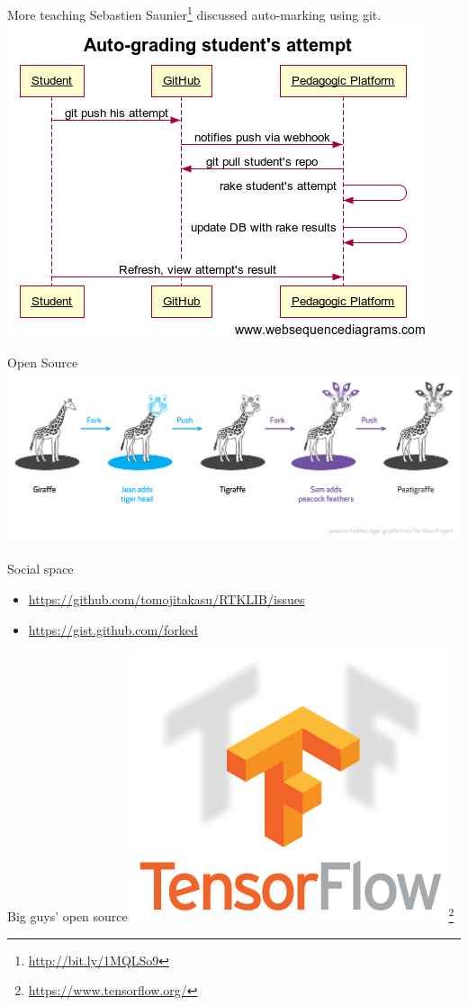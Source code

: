 \documentclass[11pt]{beamer}
\begin{document}
\begin{frame}{More teaching}
Sebastien Saunier\footnote{\url{http://bit.ly/1MQLSo9}} discussed auto-marking using git.
\centering
\includegraphics[height=0.7\textheight]{pic/git_teaching.png}
\end{frame}


\begin{frame}{Open Source}
\centering
\includegraphics[width=\textwidth]{pic/git-OS.png}
\end{frame}


\begin{frame}{Social space}
\begin{itemize}
	\item \url{https://github.com/tomojitakasu/RTKLIB/issues}
	\item \url{https://gist.github.com/forked}
\end{itemize}
\end{frame}


\begin{frame}{Big guys' open source}
\centering
\includegraphics[width=.6\textwidth]{pic/Tensorflow.png}\footnote{\url{https://www.tensorflow.org/}}
\end{frame}
\end{document}
